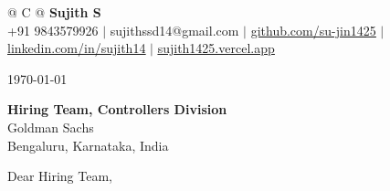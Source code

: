 \documentclass[a4paper,10pt]{article}
\newcommand{\ulink}[2]{\href{#1}{\uline{#2}}}
\begin{document}
\pagestyle{empty}

\begin{tabularx}{\linewidth}{@{} C @{}}
{\color[HTML]{000000}\fontsize{30}{35}\selectfont\bfseries Sujith S} \\[5pt]
{\fontsize{10.5}{12.5}\selectfont\textcolor[HTML]{3A3A3A}{
+91 9843579926 $|$
sujithssd14@gmail.com $|$
\ulink{https://github.com/su-jin1425}{github.com/su-jin1425} $|$
\ulink{https://linkedin.com/in/sujith14}{linkedin.com/in/sujith14} $|$
\ulink{https://sujith1425.vercel.app}{sujith1425.vercel.app}}}
\end{tabularx}

\vspace{18pt}

{\fontsize{11}{14}\selectfont\color[HTML]{3A3A3A} \today}

\vspace{10pt}

{\fontsize{11}{14}\selectfont\color[HTML]{0A0A0A}
\textbf{Hiring Team, Controllers Division} \\
Goldman Sachs \\
Bengaluru, Karnataka, India}

\vspace{14pt}

{\fontsize{11}{14}\selectfont\color[HTML]{0A0A0A} Dear Hiring Team,}

\vspace{10pt}
\end{document}
